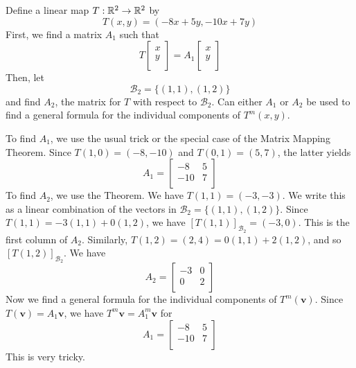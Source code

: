 \documentclass{article}
\begin{document}
\begin{example}
  Define a linear map $T: \mathbb{R}^2 \to \mathbb{R}^2$ by \[
    T(x, y) = (-8x + 5y, -10x + 7y)
  \]
  First, we find a matrix $A_1$ such that \[
    T
    \begin{bmatrix}
      x \\y\\
    \end{bmatrix} = A_1
    \begin{bmatrix}
      x \\y\\
    \end{bmatrix}
  \]
  Then, let \[
    \mathcal{B}_2 = \{(1, 1), (1, 2)\}
  \]
  and find $A_2$, the matrix for $T$ with respect to $\mathcal{B}_2$. Can either $A_1$ or $A_2$ be used to find a general formula for the individual components of $T^m(x, y)$.

  To find $A_1$, we use the usual trick or the special case of the Matrix Mapping Theorem. Since $T(1, 0) = (-8, -10)$ and $T(0, 1) = (5, 7)$, the latter yields \[
    A_1 =
    \begin{bmatrix}
      -8  & 5 \\
      -10 & 7 \\
    \end{bmatrix}
  \]
  To find $A_2$, we use the Theorem. We have $T(1, 1) = (-3, -3)$. We write this as a linear combination of the vectors in $\mathcal{B}_2 = \{(1, 1), (1, 2)\}$. Since $T(1, 1) = -3(1, 1) + 0(1, 2)$, we have $[T(1, 1)]_{\mathcal{B}_2} = (-3, 0)$. This is the first column of $A_2$. Similarly, $T(1, 2) = (2, 4) = 0(1, 1) + 2(1, 2)$, and so $[T(1, 2)]_{\mathcal{B}_2}$. We have \[
    A_2 =
    \begin{bmatrix}
      -3 & 0 \\
      0  & 2 \\
    \end{bmatrix}
  \]
  Now we find a general formula for the individual components of $T^m(\textbf{v})$. Since $T(\textbf{v}) = A_1\textbf{v}$, we have $T^m\textbf{v} = A_1^m\textbf{v}$ for \[
    A_1 =
    \begin{bmatrix}
      -8  & 5 \\
      -10 & 7 \\
    \end{bmatrix}
  \]
  This is very tricky.


\end{example}
\end{document}
